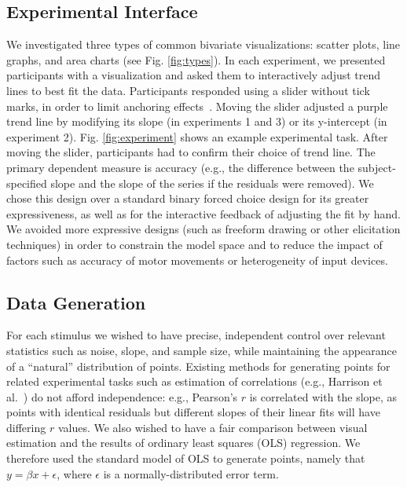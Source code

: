 \documentclass{sigchi}
\begin{document}
\subsection{Experimental Interface}
\typesFig

We investigated three types of common bivariate visualizations: scatter plots, line graphs, and area charts (see Fig. \ref{fig:types}). In each experiment, we presented participants with a visualization and asked them to interactively adjust trend lines to best fit the data.  Participants responded using a slider without tick marks, in order to limit anchoring effects~\cite{matejka2016effect}. Moving the slider adjusted a purple trend line by modifying its slope (in experiments 1 and 3) or its y-intercept (in experiment 2). Fig. \ref{fig:experiment} shows an example experimental task. After moving the slider, participants had to confirm their choice of trend line. The primary dependent measure is accuracy (e.g., the difference between the subject-specified slope and the slope of the series if the residuals were removed). We chose this design over a standard binary forced choice design for its greater expressiveness, as well as for the interactive feedback of adjusting the fit by hand. We avoided more expressive designs (such as freeform drawing or other elicitation techniques) in order to constrain the model space and to reduce the impact of factors such as accuracy of motor movements or heterogeneity of input devices. 

\subsection{Data Generation}

\sigmasFig

For each stimulus we wished to have precise, independent control over relevant statistics such as noise, slope, and sample size, while maintaining the appearance of a ``natural'' distribution of points. Existing methods for generating points for related experimental tasks such as estimation of correlations (e.g., Harrison et al.~\cite{harrison2014ranking}) do not afford independence: e.g., Pearson's $r$ is correlated with the slope, as points with identical residuals but different slopes of their linear fits will have differing $r$ values. We also wished to have a fair comparison between visual estimation and the results of ordinary least squares (OLS) regression. We therefore used the standard model of OLS to generate points, namely that $y=\beta x + \epsilon$, where $\epsilon$ is a normally-distributed error term.
\end{document}
